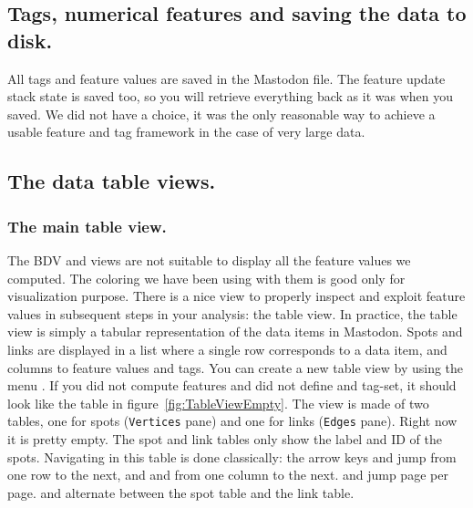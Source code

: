 \subsection{Tags, numerical features and saving the data to disk.}

All tags and feature values are saved in the Mastodon file. 
The feature update stack state is saved too, so you will retrieve everything back as it was when you saved.
We did not have a choice, it was the only reasonable way to achieve a usable feature and tag framework in the case of very large data.


\subsection{The data table views.}
\label{sec:DataTables}

\subsubsection{The main table view.}

The BDV and \TrackScheme views are not suitable to display all the feature values we computed.
The coloring we have been using with them is good only for visualization purpose. 
There is a nice view to properly inspect and exploit feature values in subsequent steps in your analysis: the table view.
In practice, the table view is simply a tabular representation of the data items in Mastodon.
Spots and links are displayed in a list where a single row corresponds to a data item, and columns to feature values and tags. 
You can create a new table view by using the menu .
If you did not compute features and did not define and tag-set, it should look like the table in figure~\ref{fig:TableViewEmpty}.
The view is made of two tables, one for spots (\texttt{Vertices} pane) and one for links (\texttt{Edges} pane).
Right now it is pretty empty. 
The spot and link tables only show the label and ID of the spots.
Navigating in this table is done classically: the arrow keys \menu{\arrowkeyup} and \keys{\arrowkeydown} jump from one row to the next, and \keys{\arrowkeyleft} and \keys{\arrowkeyright} from one column to the next.
 and  jump page per page.
 and  alternate between the spot table and the link table.

